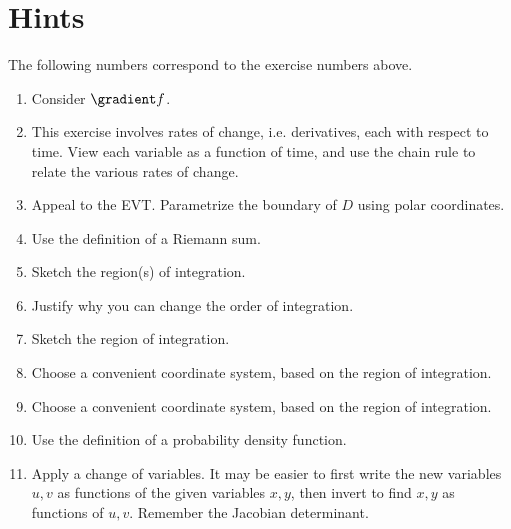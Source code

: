 %
%
%
%

\section{Hints}

The following numbers correspond to the exercise numbers above.
\begin{enumerate}
\item Consider $\gradient f$.
\item This exercise involves rates of change, i.e. derivatives, each with respect to time. View each variable as a function of time, and use the chain rule to relate the various rates of change.
\item Appeal to the EVT. Parametrize the boundary of $D$ using polar coordinates.
\item Use the definition of a Riemann sum.
\item Sketch the region(s) of integration.
\item Justify why you can change the order of integration.
\item Sketch the region of integration.
\item Choose a convenient coordinate system, based on the region of integration.
\item Choose a convenient coordinate system, based on the region of integration.
\item Use the definition of a probability density function.
\item Apply a change of variables. It may be easier to first write the new variables $u,v$ as functions of the given variables $x,y$, then invert to find $x,y$ as functions of $u,v$. Remember the Jacobian determinant.
\end{enumerate}